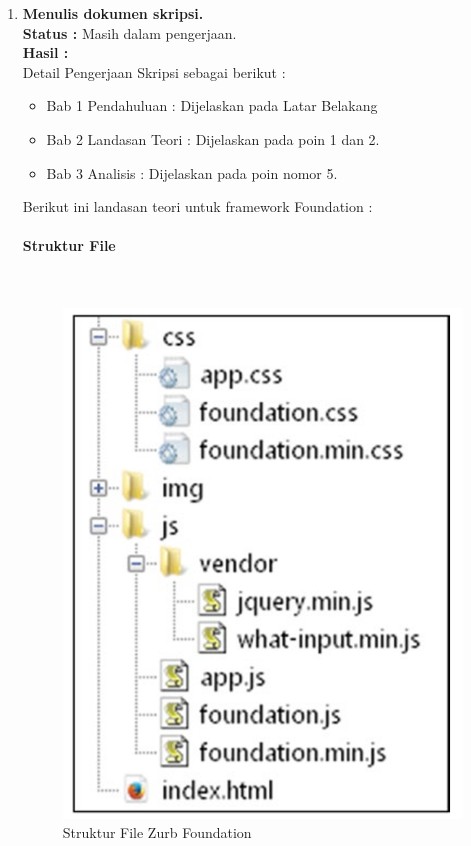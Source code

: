 \documentclass[a4paper,twoside]{article}
\newcommand{\myparagraph}[1]{\paragraph{#1}\mbox{}\\}
\begin{document}
\begin{enumerate}
		
		\item \textbf{Menulis dokumen skripsi.}\\
		{\bf Status :} Masih dalam pengerjaan. \\
		{\bf Hasil :}  \\
		Detail Pengerjaan Skripsi sebagai berikut :
		\begin{itemize}
			\item Bab 1 Pendahuluan : Dijelaskan pada Latar Belakang
			\item Bab 2 Landasan Teori : Dijelaskan pada poin 1 dan 2.
			\item Bab 3 Analisis : Dijelaskan pada poin nomor 5.
		\end{itemize}
		Berikut ini landasan teori untuk framework Foundation :
		\myparagraph{Struktur File}
		\begin{figure} [H]
			\centering  
			\includegraphics[scale=1.0]{filestructure_zurb.png}  
			\caption{Struktur File Zurb Foundation} 
		\end{figure}
		

\end{enumerate}
\end{document}
